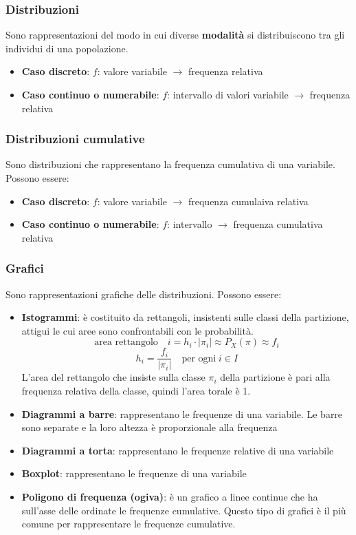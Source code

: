 \documentclass[a4paper]{article}
\theoremstyle{break}
\theoremstyle{break}
\theoremstyle{break}
\theoremstyle{break}
\begin{document}
\subsubsection{Distribuzioni}
Sono rappresentazioni del modo in cui diverse \textbf{modalità} si distribuiscono tra
gli individui di una popolazione.
\begin{itemize}
	\item \textbf{Caso discreto}: \( f \): valore variabile \( \to  \) frequenza relativa
	\item \textbf{Caso continuo o numerabile}: \( f \): intervallo di valori variabile \( \to  \) frequenza relativa
\end{itemize}

\subsubsection{Distribuzioni cumulative}
Sono distribuzioni che rappresentano la frequenza cumulativa di una variabile. Possono essere:
\begin{itemize}
	\item \textbf{Caso discreto}: \( f \): valore variabile \( \to  \) frequenza cumulaiva
    relativa
	\item \textbf{Caso continuo o numerabile}: \( f \): intervallo \( \to  \) frequenza 
    cumulativa relativa
\end{itemize}

\subsubsection{Grafici}
Sono rappresentazioni grafiche delle distribuzioni. Possono essere:
\begin{itemize}
	\item \textbf{Istogrammi}: è costituito da rettangoli, insistenti sulle classi
	      della partizione, attigui le cui aree sono confrontabili con le probabilità.
        \[
        \text{area rettangolo} \quad i = h_i \cdot |\pi _i| \approx P_X(\pi ) \approx f_i
        \] 
        \[
          h_i = \frac{f_i}{|\pi _i|} \quad \text{per ogni} \; i \in I
        \] 
      L'area del rettangolo che insiste sulla classe \( \pi_i  \) della partizione è pari
      alla frequenza relativa della classe, quindi l'area torale è 1.
  \item \textbf{Diagrammi a barre}: rappresentano le frequenze di una variabile. Le barre
        sono separate e la loro altezza è proporzionale alla frequenza
	\item \textbf{Diagrammi a torta}: rappresentano le frequenze relative di una variabile
	\item \textbf{Boxplot}: rappresentano le frequenze di una variabile
  \item \textbf{Poligono di frequenza (ogiva)}: è un grafico a linee continue che ha
    sull'asse delle ordinate le frequenze cumulative. Questo tipo di grafici è il più comune
    per rappresentare le frequenze cumulative.
\end{itemize}
\end{document}
